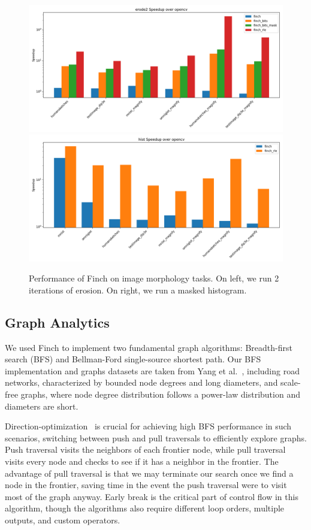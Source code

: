 \begin{figure}
	\includegraphics[width=0.5\linewidth]{erode2_speedup_over_opencv.png}%
	\includegraphics[width=0.5\linewidth]{hist_speedup_over_opencv.png}
 \vspace{-12pt}
    \caption{Performance of Finch on image morphology tasks. On left, we run 2 iterations of erosion. On right, we run a masked histogram.}\label{fig:morphology}
\end{figure}

\subsection{Graph Analytics}

We used Finch to implement two fundamental graph algorithms: Breadth-first search (BFS) and Bellman-Ford single-source shortest path. Our BFS implementation and graphs datasets are taken from Yang et al.~\cite{yang_implementing_2018}, including road networks, characterized by bounded node degrees and long diameters, and scale-free graphs, where node degree distribution follows a power-law distribution and diameters are short.

Direction-optimization~\cite{beamer2012direction} is crucial for achieving high BFS performance in such scenarios, switching between push and pull traversals to efficiently explore graphs. Push traversal visits the neighbors of each frontier node, while pull traversal visits every node and checks to see if it has a neighbor in the frontier. The advantage of pull traversal is that we may terminate our search once we find a node in the frontier, saving time in the event the push traversal were to visit most of the graph anyway. Early break is the critical part of control flow in this algorithm, though the algorithms also require different loop orders, multiple outputs, and custom operators.


